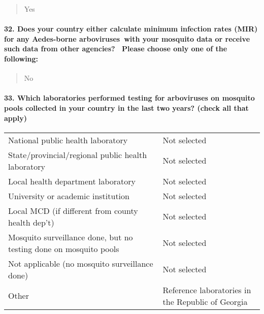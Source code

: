 \documentclass[
]{article}
\begin{document}
\begin{quote}
Yes
\end{quote}

\hypertarget{does-your-country-either-calculate-minimum-infection-rates-mir-for-any-aedes-borne-arboviruses-with-your-mosquito-data-or-receive-such-data-from-other-agencies-please-choose-only-one-of-the-following}{%
\paragraph{32. Does your country either calculate minimum infection
rates (MIR) for any Aedes-borne arboviruses~with your mosquito data or
receive such data from other agencies?~ Please choose only one of the
following:}\label{does-your-country-either-calculate-minimum-infection-rates-mir-for-any-aedes-borne-arboviruses-with-your-mosquito-data-or-receive-such-data-from-other-agencies-please-choose-only-one-of-the-following}}

\begin{quote}
No
\end{quote}

\hypertarget{which-laboratories-performed-testing-for-arboviruses-on-mosquito-pools-collected-in-your-country-in-the-last-two-years-check-all-that-apply}{%
\paragraph{33. Which laboratories performed testing for arboviruses on
mosquito pools collected in your country in the last two years? (check
all that
apply)}\label{which-laboratories-performed-testing-for-arboviruses-on-mosquito-pools-collected-in-your-country-in-the-last-two-years-check-all-that-apply}}

\begin{longtable}[]{@{}
  >{\raggedright\arraybackslash}p{}
  >{\raggedright\arraybackslash}p{}@{}}
\toprule
\endhead
National public health laboratory & Not selected \\
State/provincial/regional public health laboratory & Not selected \\
Local health department laboratory & Not selected \\
University or academic institution & Not selected \\
Local MCD (if different from county health dep't) & Not selected \\
Mosquito surveillance done, but no testing done on mosquito pools & Not
selected \\
Not applicable (no mosquito surveillance done) & Not selected \\
Other & Reference laboratories in the Republic of Georgia \\
\bottomrule
\end{longtable}
\end{document}
